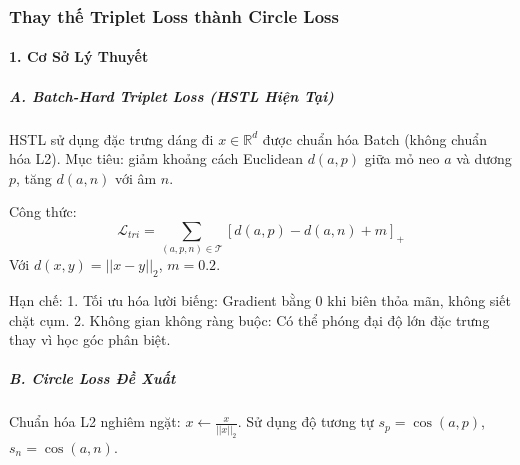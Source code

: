 

\subsubsection{Thay thế Triplet Loss thành Circle Loss}

\paragraph{1. Cơ Sở Lý Thuyết}

\subparagraph{A. Batch-Hard Triplet Loss (HSTL Hiện Tại)}

HSTL sử dụng đặc trưng dáng đi \(x \in \mathbb{R}^d\) được chuẩn hóa Batch (không chuẩn hóa L2). Mục tiêu: giảm khoảng cách Euclidean \(d(a, p)\) giữa mỏ neo \(a\) và dương \(p\), tăng \(d(a, n)\) với âm \(n\).

Công thức:
\[
\mathcal{L}_{tri} = \sum_{(a,p,n) \in \mathcal{T}} \left[ d(a, p) - d(a, n) + m \right]_+
\]
Với \(d(x, y) = ||x - y||_2\), \(m = 0.2\).

Hạn chế:
1. Tối ưu hóa lười biếng: Gradient bằng 0 khi biên thỏa mãn, không siết chặt cụm.
2. Không gian không ràng buộc: Có thể phóng đại độ lớn đặc trưng thay vì học góc phân biệt.

\subparagraph{B. Circle Loss Đề Xuất}

Chuẩn hóa L2 nghiêm ngặt: \(x \leftarrow \frac{x}{||x||_2}\). Sử dụng độ tương tự \(s_p = \cos(a, p)\), \(s_n = \cos(a, n)\).


